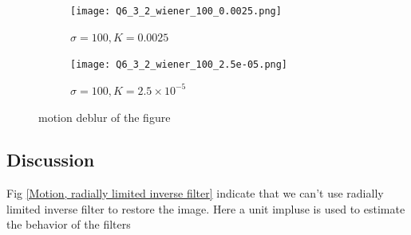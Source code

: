 \documentclass[
	12pt, %
]{style/fphw}
\begin{document}
\begin{figure}[H]
			\hfill
			\begin{subfigure}[b]{.3\textwidth}
				\centering
				\texttt{[image: Q6\_3\_2\_wiener\_100\_0.0025.png]}
				\caption{$\sigma=100, K=0.0025$}
				\label{Q6_3_2_wiener_100_0.0025}
			\end{subfigure}
			\hfill
			\begin{subfigure}[b]{.3\textwidth}
				\centering
				\texttt{[image: Q6\_3\_2\_wiener\_100\_2.5e-05.png]}
				\caption{$\sigma=100, K=2.5 \times 10^{-5}$}
				\label{Q6_3_2_wiener_100_2.5e-05}
			\end{subfigure}
		\caption{motion deblur of the figure}
		\label{motion deblur of the figure}	
	\end{figure}

\subsection*{Discussion}

Fig \ref{Motion, radially limited inverse filter} indicate that we can't use radially limited inverse filter to restore the image. Here a unit impluse is used to estimate the behavior of the filters
\end{document}
